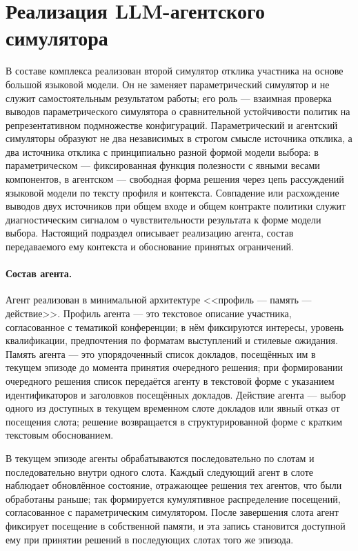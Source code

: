 \section{Реализация LLM-агентского симулятора}
\label{sec:3-5}

В составе комплекса реализован второй симулятор отклика участника на основе большой языковой модели. Он не заменяет параметрический симулятор и не служит самостоятельным результатом работы; его роль --- взаимная проверка выводов параметрического симулятора о сравнительной устойчивости политик на репрезентативном подмножестве конфигураций. Параметрический и агентский симуляторы образуют не два независимых в строгом смысле источника отклика, а два источника отклика с принципиально разной формой модели выбора: в параметрическом --- фиксированная функция полезности с явными весами компонентов, в агентском --- свободная форма решения через цепь рассуждений языковой модели по тексту профиля и контекста. Совпадение или расхождение выводов двух источников при общем входе и общем контракте политики служит диагностическим сигналом о чувствительности результата к форме модели выбора. Настоящий подраздел описывает реализацию агента, состав передаваемого ему контекста и обоснование принятых ограничений.

\paragraph{Состав агента.}
Агент реализован в минимальной архитектуре <<профиль --- память --- действие>>. Профиль агента --- это текстовое описание участника, согласованное с тематикой конференции; в нём фиксируются интересы, уровень квалификации, предпочтения по форматам выступлений и стилевые ожидания. Память агента --- это упорядоченный список докладов, посещённых им в текущем эпизоде до момента принятия очередного решения; при формировании очередного решения список передаётся агенту в текстовой форме с указанием идентификаторов и заголовков посещённых докладов. Действие агента --- выбор одного из доступных в текущем временном слоте докладов или явный отказ от посещения слота; решение возвращается в структурированной форме с кратким текстовым обоснованием.

В текущем эпизоде агенты обрабатываются последовательно по слотам и последовательно внутри одного слота. Каждый следующий агент в слоте наблюдает обновлённое состояние, отражающее решения тех агентов, что были обработаны раньше; так формируется кумулятивное распределение посещений, согласованное с параметрическим симулятором. После завершения слота агент фиксирует посещение в собственной памяти, и эта запись становится доступной ему при принятии решений в последующих слотах того же эпизода.

